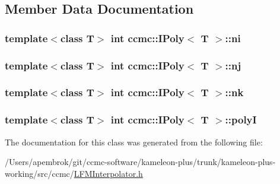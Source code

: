 \subsection{Member Data Documentation}
\hypertarget{classccmc_1_1_i_poly_acc18cf8374b6dc4b5f7ba6d618b63450}{
\subsubsection[{ni}]{\setlength{\rightskip}{0pt plus 5cm}template$<$class T$>$ int {\bf ccmc\-::\-I\-Poly}$<$ T $>$\-::ni}}\label{classccmc_1_1_i_poly_acc18cf8374b6dc4b5f7ba6d618b63450}
\hypertarget{classccmc_1_1_i_poly_a83b93fc10fc608cde13d8750630e5e8a}{
\subsubsection[{nj}]{\setlength{\rightskip}{0pt plus 5cm}template$<$class T$>$ int {\bf ccmc\-::\-I\-Poly}$<$ T $>$\-::nj}}\label{classccmc_1_1_i_poly_a83b93fc10fc608cde13d8750630e5e8a}
\hypertarget{classccmc_1_1_i_poly_a374a6273e608cf09d71173baf4e3593b}{
\subsubsection[{nk}]{\setlength{\rightskip}{0pt plus 5cm}template$<$class T$>$ int {\bf ccmc\-::\-I\-Poly}$<$ T $>$\-::nk}}\label{classccmc_1_1_i_poly_a374a6273e608cf09d71173baf4e3593b}
\hypertarget{classccmc_1_1_i_poly_a2b001122fdcd1d21eae47e24f4ba7f0e}{
\subsubsection[{poly\-I}]{\setlength{\rightskip}{0pt plus 5cm}template$<$class T$>$ int {\bf ccmc\-::\-I\-Poly}$<$ T $>$\-::poly\-I}}\label{classccmc_1_1_i_poly_a2b001122fdcd1d21eae47e24f4ba7f0e}


The documentation for this class was generated from the following file\-:\begin{DoxyCompactItemize}
\item 
/\-Users/apembrok/git/ccmc-\/software/kameleon-\/plus/trunk/kameleon-\/plus-\/working/src/ccmc/\hyperlink{_l_f_m_interpolator_8h}{L\-F\-M\-Interpolator.\-h}\end{DoxyCompactItemize}
